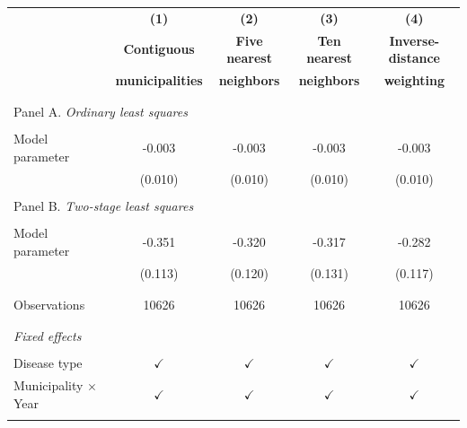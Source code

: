 \begin{tabular}{l c c c c}
\toprule[1.5pt]
\multicolumn{1}{c}{\textbf{}} & \textbf{(1)} & \textbf{(2)} & \textbf{(3)} & \textbf{(4)}   \\
\multicolumn{1}{c}{\textbf{}} & \textbf{Contiguous} & \textbf{Five nearest} & \textbf{Ten nearest} & \textbf{Inverse-distance}   \\
\multicolumn{1}{c}{\textbf{}} & \textbf{municipalities} & \textbf{neighbors} & \textbf{neighbors} & \textbf{weighting}   \\ \hline \\
\\
\multicolumn{5}{l}{Panel A. \textit{Ordinary least squares}}\\
\\
Model parameter   & -0.003 & -0.003 & -0.003 & -0.003  \\
& (0.010) & (0.010)  & (0.010) & (0.010)  \\
\\
\multicolumn{5}{l}{Panel B. \textit{Two-stage least squares}}\\
\\
Model parameter & -0.351 & -0.320 & -0.317 & -0.282  \\
& (0.113) & (0.120)  & (0.131) & (0.117)  \\
\\
\midrule[1 pt]
\\
Observations & 10626 & 10626 &  10626 & 10626 \\
\\
\midrule[1 pt]
\\
\multicolumn{5}{l}{\textit{Fixed effects}} \\
\\
Disease type & $\checkmark$ & $\checkmark$ & $\checkmark$  & $\checkmark$ \\
Municipality $\times$ Year & $\checkmark$   &  $\checkmark$ & $\checkmark$ & $\checkmark$ \\
\\
\midrule[1 pt]
\end{tabular}
